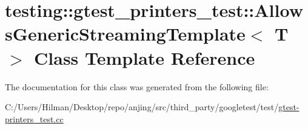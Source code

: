 \hypertarget{classtesting_1_1gtest__printers__test_1_1_allows_generic_streaming_template}{}\section{testing\+:\+:gtest\+\_\+printers\+\_\+test\+:\+:Allows\+Generic\+Streaming\+Template$<$ T $>$ Class Template Reference}
\label{classtesting_1_1gtest__printers__test_1_1_allows_generic_streaming_template}


The documentation for this class was generated from the following file\+:\begin{DoxyCompactItemize}
\item 
C\+:/\+Users/\+Hilman/\+Desktop/repo/anjing/src/third\+\_\+party/googletest/test/\hyperlink{gtest-printers__test_8cc}{gtest-\/printers\+\_\+test.\+cc}\end{DoxyCompactItemize}
